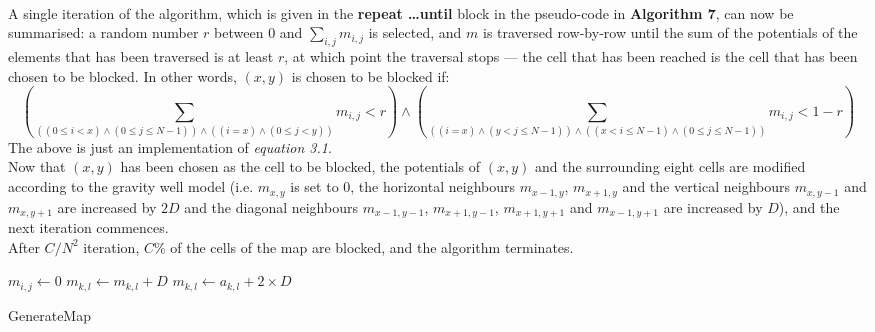 \documentclass[12pt,notitlepage]{report}
\begin{document}
\\
\noindent
A single iteration of the algorithm, which is given in the {\bfseries repeat \ldots until} block in the pseudo-code in {\bfseries Algorithm 7}, can now be summarised: a random number $r$ between $0$ and $\sum\limits_{i,j} m_{i,j}$ is selected, and $m$ is traversed row-by-row until the sum of the potentials of the elements that has been traversed is at least $r$, at which point the traversal stops --- the cell that has been reached is the cell that has been chosen to be blocked. In other words, $(x,y)$ is chosen to be blocked if:
\begin{equation}
(\sum\limits_{((0 \leq i < x) \land (0 \leq j \leq N-1)) \land ((i = x) \land (0 \leq j < y))}m_{i,j} < r) \land (\sum\limits_{((i = x) \land (y < j \leq N-1)) \land ((x < i \leq N-1) \land (0 \leq j \leq N-1))}m_{i,j} < 1-r)
\end{equation}
\noindent
The above is just an implementation of {\em equation 3.1}.\\

\noindent
Now that $(x,y)$ has been chosen as the cell to be blocked, the potentials of $(x,y)$ and the surrounding eight cells are modified according to the gravity well model (i.e. $m_{x,y}$ is set to $0$, the horizontal neighbours $m_{x-1,y}$, $m_{x+1,y}$ and the vertical neighbours $m_{x,y-1}$ and $m_{x,y+1}$ are increased by $2D$ and the diagonal neighbours $m_{x-1,y-1}$, $m_{x+1,y-1}$, $m_{x+1,y+1}$ and $m_{x-1,y+1}$ are increased by $D$), and the next iteration commences.\\

\noindent
After $C/N^{2}$ iteration, $C\%$ of the cells of the map are blocked, and the algorithm terminates.

\begin{algorithm}
  \SetAlgoLined\DontPrintSemicolon
   
   {
    \nl $m_{i,j} \gets 0$\;
    \nl {} {
      \nl {} {
        \nl $m_{k,l} \gets m_{k,l} + D$\;
      }
  }
  \nl {} {
      \nl {} {
        $m_{k,l} \gets a_{k,l} + 2\times D$\;
      }
  }
}
\caption{{\sc GenerateMap}}
 \end{algorithm} 
 
\end{document}
